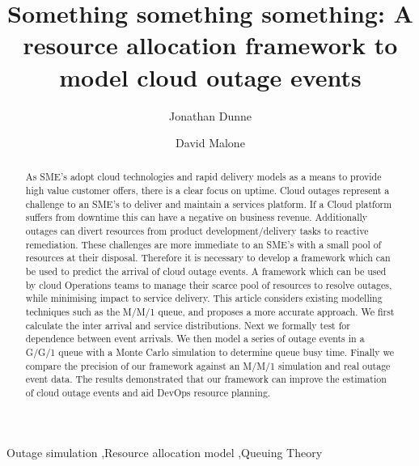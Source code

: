 \documentclass[5p]{elsarticle}
\begin{document}
\begin{frontmatter}

\title{Something something something: A resource allocation framework to model cloud outage events}


\author[mymainaddress]{Jonathan Dunne}

\author[mymainaddress]{David Malone}

\address[mymainaddress]{Hamilton Institlute, Maynooth University, Kildare, Ireland}

\begin{abstract}
As SME's adopt cloud technologies and rapid delivery models as a means to provide high value customer offers, there is a clear focus on uptime. Cloud outages represent a challenge to an SME's to deliver and maintain a services platform. If a Cloud platform suffers from downtime this can have a negative on business revenue. Additionally outages can divert resources from product development/delivery tasks to reactive remediation. These challenges are more immediate to an SME's with a small pool of resources at their disposal. Therefore it is necessary to develop a framework which can be used to predict the arrival of cloud outage events. A framework which can be used by cloud Operations teams to manage their scarce pool of resources to resolve outages, while minimising impact to service delivery. This article considers existing modelling techniques such as the M/M/1 queue, and proposes a more accurate approach. We first calculate the inter arrival and service distributions. Next we formally test for dependence between event arrivals. We then model a series of outage events in a G/G/1 queue with a Monte Carlo simulation to determine queue busy time.  Finally we compare the precision of our framework against an M/M/1 simulation and real outage event data. The results demonstrated that our framework can improve the estimation of cloud outage events and aid DevOps resource planning.
\end{abstract}

\begin{keyword}
Outage simulation \sep Resource allocation model \sep Queuing Theory 
\end{keyword}

\end{frontmatter}
\end{document}
